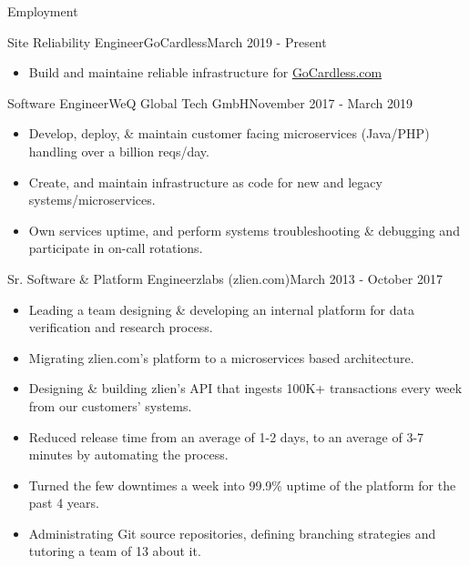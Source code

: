 \documentclass[]{mosabcv}
\begin{document}
\makeheader 

\begin{cvsection}{Employment}
  \begin{cvsubsection}{Site Reliability Engineer}{GoCardless}{March 2019 - Present}
    \begin{itemize}
      \item Build and maintaine reliable infrastructure for \href{https://www.gocardless.com}{GoCardless.com}
    \end{itemize}
  \end{cvsubsection}

  \begin{cvsubsection}{Software Engineer}{WeQ Global Tech GmbH}{November 2017 - March 2019}
    \begin{itemize}
      \item Develop, deploy, \& maintain customer facing microservices (Java/PHP) handling over a billion reqs/day.
      \item Create, and maintain infrastructure as code for new and legacy systems/microservices.
      \item Own services uptime, and perform systems troubleshooting \& debugging and participate in on-call rotations.
    \end{itemize}
  \end{cvsubsection}

  \begin{cvsubsection}{Sr. Software \& Platform Engineer}{zlabs (zlien.com)}{March 2013 - October 2017}
    \begin{itemize}
      \item Leading a team designing \& developing an internal platform for data verification and research process.
      \item Migrating zlien.com's platform to a microservices based architecture.
      \item Designing \& building zlien's API that ingests 100K+ transactions every week from our customers' systems.
      \item Reduced release time from an average of 1-2 days, to an average of 3-7 minutes by automating the process.
      \item Turned the few downtimes a week into 99.9\% uptime of the platform for the past 4 years.
      \item Administrating Git source repositories, defining branching strategies and tutoring a team of 13 about it.
    \end{itemize}
  \end{cvsubsection}


\end{cvsection}
\end{document}
